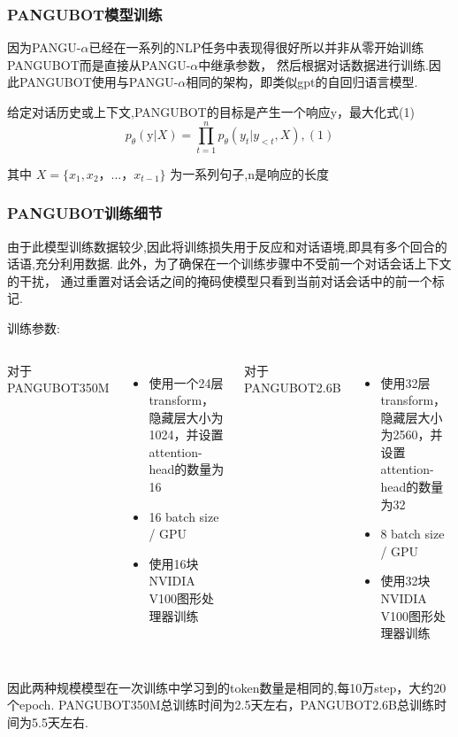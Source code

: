 \documentclass{beamer}
\begin{document}
\begin{frame}
    \frametitle{PANGUBOT模型训练}

    因为PANGU-$\alpha$已经在一系列的NLP任务中表现得很好所以并非从零开始训练PANGUBOT而是直接从PANGU-$\alpha$中继承参数，
    然后根据对话数据进行训练.因此PANGUBOT使用与PANGU-$\alpha$相同的架构，即类似gpt的自回归语言模型.

    给定对话历史或上下文,PANGUBOT的目标是产生一个响应y，最大化式(1)
    $$ p_\theta(\text{y}|X) = \prod ^n _{t=1} p_\theta(y_t | y_{<t},X) , (1) $$

    其中 $ X = \{x_1, x_2，\ldots，x_{t−1}\} $ 为一系列句子,n是响应的长度

\end{frame}

\begin{frame}
    \frametitle{PANGUBOT训练细节}

    由于此模型训练数据较少,因此将训练损失用于反应和对话语境,即具有多个回合的话语,充分利用数据.
    此外，为了确保在一个训练步骤中不受前一个对话会话上下文的干扰，
    通过重置对话会话之间的掩码使模型只看到当前对话会话中的前一个标记.

    训练参数:
    \begin{columns}
        对于PANGUBOT350M
        \begin{itemize}
            \item 使用一个24层transform，隐藏层大小为1024，并设置attention-head的数量为16
            \item 16 batch size / GPU
            \item 使用16块NVIDIA V100图形处理器训练
        \end{itemize}

        对于PANGUBOT2.6B
        \begin{itemize}
            \item 使用32层transform，隐藏层大小为2560，并设置attention-head的数量为32
            \item 8 batch size / GPU
            \item 使用32块NVIDIA V100图形处理器训练
        \end{itemize}
    \end{columns}
    因此两种规模模型在一次训练中学习到的token数量是相同的,每10万step，大约20个epoch.
    PANGUBOT350M总训练时间为2.5天左右，PANGUBOT2.6B总训练时间为5.5天左右.

\end{frame}
\end{document}
